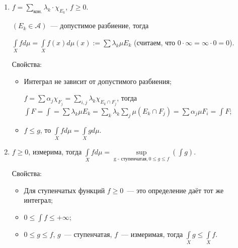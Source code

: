 \documentclass{article}
\begin{document}
        \begin{enumerate}
        
            \item $f = \sum\limits_{\text{кон.}} \lambda_k \cdot \chi_{E_k}$, $f \geqslant 0$.
            
                $(E_k \in \mathcal{A})$~--- допустимое разбиение, тогда 
                
                $\int\limits_{X} f d \mu = \int\limits_{X} f(x) d \mu(x) := \sum \lambda_k \mu E_k$ (считаем, что $0 \cdot \infty = \infty \cdot 0 = 0$).
                
                Свойства:
                
                \begin{itemize}
                
                    \item Интеграл не зависит от допустимого разбиения;
                    
                        $f = \sum \alpha_j \chi_{F_j} = \sum\limits_{i, j} \lambda_k \chi_{E_k \cap F_j}$, тогда $\int F = \int = \sum \lambda_k \mu E_k = \sum\limits_{k} \lambda_k \sum\limits_j \mu (E_k \cap F_j) = \sum \alpha_j \mu F_i = \int F$;
                        
                    \item $f \leqslant g$, то $\int\limits_{X} f d \mu = \int\limits_{X} g d \mu$.
                    
                \end{itemize}
                
            \item $f \geqslant 0$, измерима, тогда $\int\limits_{X} f d \mu = \sup\limits_{\text{g - ступенчатая}, 0 \leqslant g \leqslant f} \left( \int g \right)$.
            
                Свойства:
                
                \begin{itemize}
                
                    \item Для ступенчатых функций $f \geqslant 0$~--- это определение даёт тот же интеграл;
                    
                    \item $0 \leqslant \int f \leqslant +\infty$;
                    
                    \item $0 \leqslant g \leqslant f$, $g$~--- ступенчатая, $f$~--- измеримая, тогда $\int\limits_{X} g \leqslant \int\limits_{X} f$.
                    

\end{itemize}
\end{enumerate}
\end{document}
